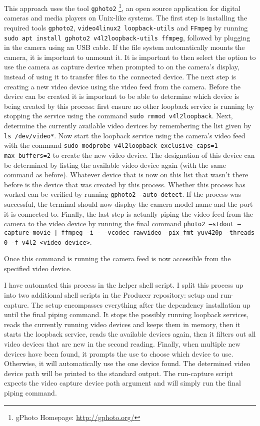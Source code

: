This approach uses the tool \texttt{gphoto2} \footnote{gPhoto Homepage: \url{http://gphoto.org/}}, an open source application for digital cameras and media players on Unix-like systems. The first step is installing the required tools \texttt{gphoto2}, \texttt{video4linux2 loopback-utils} and \texttt{FFmpeg} by running \texttt{sudo apt install gphoto2 v4l2loopback-utils ffmpeg}, followed by plugging in the camera using an USB cable. If the file system automatically mounts the camera, it is important to unmount it. It is important to then select the option to use the camera as capture device when prompted to on the camera's display, instead of using it to transfer files to the connected device. The next step is creating a new video device using the video feed from the camera. Before the device can be created it is important to be able to determine which device is being created by this process: first ensure no other loopback service is running by stopping the service using the command \texttt{sudo rmmod v4l2loopback}. Next, determine the currently available video devices by remembering the list given by \texttt{ls /dev/video*}. Now start the loopback service using the camera's video feed with the command \texttt{sudo modprobe v4l2loopback exclusive\_caps=1 max\_buffers=2} to create the new video device. The designation of this device can be determined by listing the available video device again (with the same command as before). Whatever device that is now on this list that wasn't there before is the device that was created by this process. Whether this process has worked can be verified by running \texttt{gphoto2 --auto-detect}. If the process was successful, the terminal should now display the camera model name and the port it is connected to. Finally, the last step is actually piping the video feed from the camera to the video device by running the final command \texttt{photo2 --stdout --capture-movie | ffmpeg -i - -vcodec rawvideo -pix\_fmt yuv420p -threads 0 -f v4l2 <video device>}. 

Once this command is running the camera feed is now accessible from the specified video device.

I have automated this process in the helper shell script. I split this process up into two additional shell scripts in the Producer repository: setup and run-capture. The setup encompasses everything after the dependency installation up until the final piping command. It stops the possibly running loopback services, reads the currently running video devices and keeps them in memory, then it starts the loopback service, reads the available devices again, then it filters out all video devices that are new in the second reading. Finally, when multiple new devices have been found, it prompts the use to choose which device to use. Otherwise, it will automatically use the one device found. The determined video device path will be printed to the standard output. The run-capture script expects the video capture device path argument and will simply run the final piping command.

